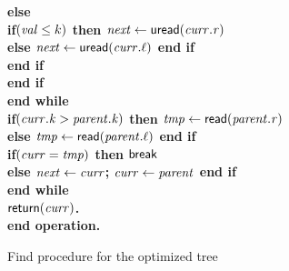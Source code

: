 \begin{figure}[h!]
{{\begin{minipage}[t]{150mm}
\begin{tabbing}
		 \>\>\>\>\> \bf{else} \\
		 \>\>\>\>\>\> \bf{if}$(\ms{val} \leq k)$ \bf{then} $\ms{next} \gets \lit{uread}(\ms{curr.r})$ \\%
		 \>\>\>\>\>\>\> \bf{else} $\ms{next} \gets \lit{uread}(\ms{curr.\ell})$ \bf{end if} \\%
		 \>\>\>\> \bf{end if} \\
		 \>\>\> \bf{end if} \\
		 \>\> \bf{end while} \\
		 \>\> \bf{if}$(\ms{curr.k} > \ms{parent.k})$ \bf{then} $\ms{tmp} \gets \lit{read}(\ms{parent.r})$ \\%
		 \>\>\> \bf{else} $\ms{tmp} \gets \lit{read}(\ms{parent.\ell})$  \bf{end if} \\%
		 \>\> \bf{if}$(\ms{curr} = \ms{tmp})$ \bf{then} $\lit{break}$ \\%
		 \>\>\> \bf{else} $\ms{next} \gets \ms{curr}$; $\ms{curr} \gets \ms{parent}$  {\bf end if} \\%
 		 \> \bf{end while} \\
		 \> $\sf{return}(\ms{curr})$. \\%
{\bf end operation}.
		
\end{tabbing}
\normalsize
\end{minipage}
}
\caption{Find procedure for the optimized tree}
\label{fig:tree-opt-find}
}
\end{figure}



